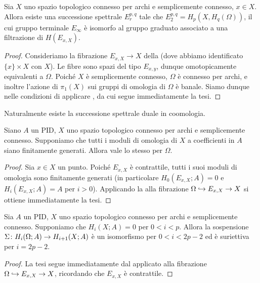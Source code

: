 \begin{proposition}
Sia $X$ uno spazio topologico connesso per archi e semplicemente connesso, $x\in X$. Allora esiste una successione spettrale $E^{p,q}_r$ tale che $E^{p,q}_2=H_p(X,H_q(\Omega))$, il cui gruppo terminale $E_\infty$ è isomorfo al gruppo graduato associato a una filtrazione di $H(E_{x,X})$.
\end{proposition}
\begin{proof}
Consideriamo la fibrazione $E_{x,X}\to X$ della  (dove abbiamo identificato $\{x\}\times X$ con $X$). Le fibre sono spazi del tipo $E_{x,y}$, dunque omotopicamente equivalenti a $\Omega$. Poiché $X$ è semplicemente connesso, $\Omega$ è connesso per archi, e inoltre l'azione di $\pi_1(X)$ sui gruppi di omologia di $\Omega$ è banale. Siamo dunque nelle condizioni di applicare \missing{}, da cui segue immediatamente la tesi.
\end{proof}
Naturalmente esiste la successione spettrale duale in coomologia.

\begin{proposition}
Siano $A$ un PID, $X$ uno spazio topologico connesso per archi e semplicemente connesso. Supponiamo che tutti i moduli di omologia di $X$ a coefficienti in $A$ siano finitamente generati. Allora vale lo stesso per $\Omega$.
\end{proposition}
\begin{proof}
Sia $x\in X$ un punto. Poiché $E_{x,X}$ è contrattile, tutti i suoi moduli di omologia sono finitamente generati (in particolare $H_0(E_{x,X};A)=0$ e $H_i(E_{x,X};A)=A$ per $i>0$). Applicando la  alla fibrazione $\Omega\hookrightarrow E_{x,X}\to X$ si ottiene immediatamente la tesi.
\end{proof}

\begin{proposition}
Sia $A$ un PID, $X$ uno spazio topologico connesso per archi e semplicemente connesso. Supponiamo che $H_i(X;A)=0$ per $0<i<p$. Allora la sospensione $\Sigma\colon H_i(\Omega;A)\to H_{i+1}(X;A)$ è un isomorfismo per $0<i<2p-2$ ed è suriettiva per $i=2p-2$.
\end{proposition}
\begin{proof}
La tesi segue immediatamente dal  applicato alla fibrazione $\Omega\hookrightarrow E_{x,X}\to X$, ricordando che $E_{x,X}$ è contrattile.
\end{proof}